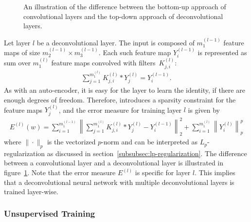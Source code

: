 \begin{figure}[b!]
	\caption[Illustration of the top-down approach of deconvolutional layers.]{An illustration of the difference between the bottom-up approach of convolutional layers and the top-down approach of deconvolutional layers.}
	\label{fig:deconvolutional-layer}
\end{figure}
Let layer $l$ be a deconvolutional layer. The input is composed of $m_1^{(l-1)}$ feature maps of size $m_2^{(l-1)} \times m_3^{(l-1)}$. Each such feature map $Y_i^{(l-1)}$ is represented as sum over $m_1^{(l)}$ feature maps convolved with filters~$K_{j,i}^{(l)}$:
\begin{align}
	\sum _{j = 1} ^{m_1^{(l)}} K_{j,i}^{(l)} \ast Y_j^{(l)} = Y_i^{(l-1)}.
\end{align}
As with an auto-encoder, it is easy for the layer to learn the identity, if there are enough degrees of freedom. Therefore, \cite{ZeilerKrishnanTaylorFergus:2010} introduces a sparsity constraint for the feature maps $Y_j^{(l)}$, and the error measure for training layer $l$ is given by
\begin{align}
	\label{eq:error-deconvolutional-layer}
	E^{(l)}(w) = \sum_{i = 1}^{m_1^{(l - 1)}} \left\| \sum_{j = 1}^{m_1^{(l)}} K_{j,i}^{(l)} \ast Y_j^{(l)} - Y_i^{(l-1)} \right\|_2^2 + \sum _{i = 1}^{m_1^{(l)}} \left \| Y_i^{(l)} \right\|_p^p
\end{align}
where $\|\cdot\|_p$ is the vectorized $p$-norm and can be interpreted as $L_p$-regularization as discussed in section~\ref{subsubsec:lp-regularization}. The difference between a convolutional layer and a deconvolutional layer is illustrated in figure~\ref{fig:deconvolutional-layer}. Note that the error measure $E^{(l)}$ is specific for layer $l$. This implies that a deconvolutional neural network with multiple deconvolutional layers is trained layer-wise.

\subsubsection{Unsupervised Training}

